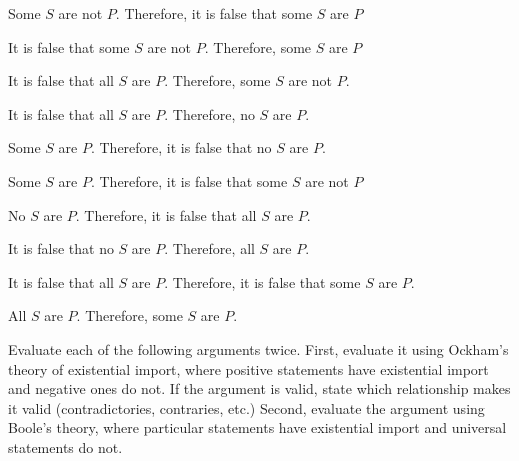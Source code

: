 \begin{exercises}
\item Some $S$ are not $P$. Therefore, it is false that some $S$ are $P$
\item It is false that some $S$ are not $P$. Therefore, some $S$ are $P$
\item It is false that all $S$ are $P$. Therefore, some $S$ are not $P$.
\item It is false that all $S$ are $P$. Therefore, no $S$ are $P$.
\item Some $S$ are $P$. Therefore, it is false that no $S$ are $P$.
\item Some $S$ are $P$. Therefore, it is false that some $S$ are not $P$
\item No $S$ are $P$. Therefore, it is false that all $S$ are $P$.
\item It is false that no $S$ are $P$. Therefore, all $S$ are $P$.
\item It is false that all $S$ are $P$. Therefore, it is false that some $S$ are $P$.
\item All $S$ are $P$. Therefore, some $S$ are $P$.
\end{exercises}






\practiceproblems
\problempart Evaluate each of the following arguments twice. First, evaluate it using Ockham's theory of existential import, where positive statements have existential import and negative ones do not. If the argument is valid, state which relationship makes it valid (contradictories, contraries, etc.) Second, evaluate the argument using Boole's theory, where particular statements have existential import and universal statements do not. %

